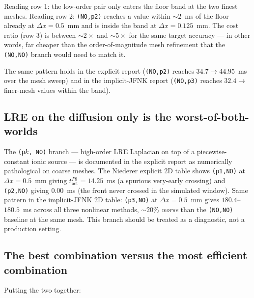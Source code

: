 \documentclass[11pt,a4paper]{article}
\newcommand{\tact}{t_{\text{act}}^{P8}}
\newcommand{\code}[1]{\texttt{\small #1}}
\begin{document}
Reading row 1: the low-order pair only enters the floor band at the
two finest meshes. Reading row 2: \code{(NO,p2)} reaches a value
within $\sim 2$~ms of the floor already at $\Delta x = 0.5$~mm and is
inside the band at $\Delta x = 0.125$~mm. The cost ratio (row 3) is
between $\sim 2\times$ and $\sim 5\times$ for the same target
accuracy --- in other words, far cheaper than the order-of-magnitude
mesh refinement that the \code{(NO,NO)} branch would need to match it.

The same pattern holds in the explicit report (\code{(NO,p2)} reaches
$34.7 \rightarrow 44.95$~ms over the mesh sweep) and in the
implicit-JFNK report (\code{(NO,p3)} reaches $32.4 \rightarrow$
finer-mesh values within the band).

\subsection{LRE on the diffusion only is the worst-of-both-worlds}

The \code{(p$k$, NO)} branch --- high-order LRE Laplacian on top of a
piecewise-constant ionic source --- is documented in the explicit
report as numerically pathological on coarse meshes. The Niederer
explicit 2D table shows \code{(p1,NO)} at $\Delta x = 0.5$~mm giving
$\tact = 14.25$~ms (a spurious very-early crossing) and
\code{(p2,NO)} giving $0.00$~ms (the front never crossed in the
simulated window). Same pattern in the implicit-JFNK 2D table:
\code{(p3,NO)} at $\Delta x = 0.5$~mm gives $180.4$--$180.5$~ms across
all three nonlinear methods, $\sim 20$\% \emph{worse} than the
\code{(NO,NO)} baseline at the same mesh. This branch should be
treated as a diagnostic, not a production setting.

\subsection{The best combination versus the most efficient combination}

Putting the two together:
\end{document}
